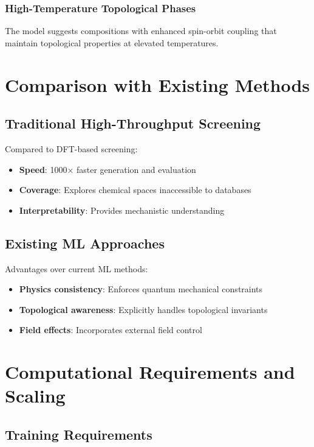 \documentclass[12pt,a4paper]{article}
\begin{document}
\subsubsection{High-Temperature Topological Phases}

The model suggests compositions with enhanced spin-orbit coupling that maintain topological properties at elevated temperatures.

\section{Comparison with Existing Methods}

\subsection{Traditional High-Throughput Screening}

Compared to DFT-based screening:
\begin{itemize}
\item \textbf{Speed}: 1000× faster generation and evaluation
\item \textbf{Coverage}: Explores chemical spaces inaccessible to databases
\item \textbf{Interpretability}: Provides mechanistic understanding
\end{itemize}

\subsection{Existing ML Approaches}

Advantages over current ML methods:
\begin{itemize}
\item \textbf{Physics consistency}: Enforces quantum mechanical constraints
\item \textbf{Topological awareness}: Explicitly handles topological invariants
\item \textbf{Field effects}: Incorporates external field control
\end{itemize}

\section{Computational Requirements and Scaling}

\subsection{Training Requirements}
\end{document}
